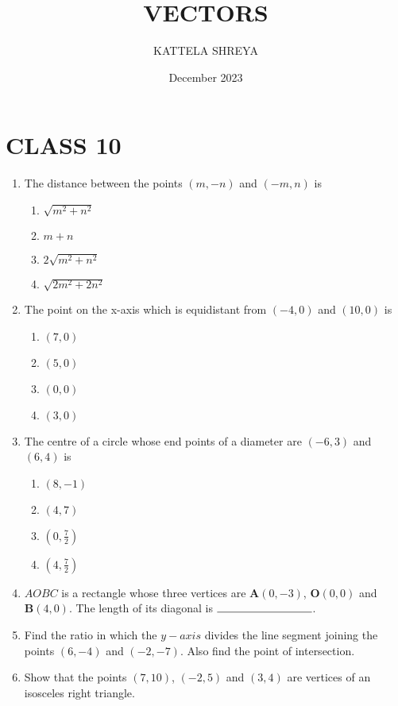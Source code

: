 \documentclass[12pt,-letter paper]{article}
\title{VECTORS}
\author{KATTELA SHREYA}
\date{December 2023}
\let\vec\mathbf{}
\let\vec\mathbf{}
\providecommand{\brak}[1]{\ensuremath{\left(#1\right)}}
\begin{document}
             
\maketitle
\section{CLASS 10}
\begin{enumerate}
\item The distance between the points $\brak{m,-n}$ and $\brak{-m, n}$ is
\begin{enumerate}
\item $\sqrt{m^{2} + n^{2}}$
\item $ m+n $
\item $ 2\sqrt{m^{2} + n^{2}}$
\item $\sqrt{2m^{2} + 2n^{2}}$
\end{enumerate}
\item The point on the x-axis which is equidistant from $\brak{-4,0}$ and $\brak{10,0}$ is
\begin{enumerate}             
\item $\brak{7,0}$
\item $\brak{5,0}$              
\item $\brak{0,0}$
\item $\brak{3,0}$
\end{enumerate}
\item The centre of a circle whose end points of a diameter are $\brak{-6,3}$ and $\brak{6,4}$ is
\begin{enumerate}
\item $\brak{8,-1}$
\item $\brak{4,7}$
\item $\brak{0,\frac{7}{2}}$
\item $\brak{4,\frac{7}{2}}$
\end{enumerate}
\item $AOBC$ is a rectangle whose three vertices are $\vec{A}\brak{0,-3}$, $\vec{O}\brak{0,0}$ and $\vec{B}\brak{4,0}$. The length of its diagonal is $\rule{3cm}{0.15mm}$.
\item Find the ratio in which the $y-axis$ divides the line segment joining the points $\brak{6,-4}$ and $\brak{-2, -7}$. Also find the point of intersection.
\item Show that the points $\brak{7, 10}$, $\brak{-2, 5}$ and $\brak{3, 4}$ are vertices of an isosceles right triangle.
\end{enumerate}
\end{document}
